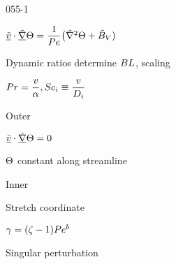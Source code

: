 \begin{mitframe}{055-1}
\begin{listone}
	\item $\uline{\tilde{\vvel}}\cdot\tilde{\gradop}\dimltemp=\dfrac{1}{\peclet}\big(\tilde{\nabla}^2\dimltemp+\tilde{\exergy}_{\vol})$
    	\begin{listtwo}
        	\item Dynamic ratios determine $\exergy\length$, scaling
            \begin{listthree}
            	\item $\prandtl=\dfrac{\vvel}{\tdiff},\schmidt_{\state}\equiv\dfrac{\vvel}{\pdiff}$
            \end{listthree}
        \item Outer
        	\begin{listtwo}
            	\item $\uline{\tilde{\vvel}}\cdot\tilde{\gradop}\dimltemp=0$
                \item $\dimltemp$ constant along streamline
            \end{listtwo}
        \item Inner
        	\begin{listthree}
            	\item Stretch coordinate
                \begin{listfour}
                	\item $\gamma=(\zeta-1)\peclet^b$
                \end{listfour}
                \item Singular perturbation
            \end{listthree}
        \end{listtwo}
    \end{listone}    
\end{mitframe}